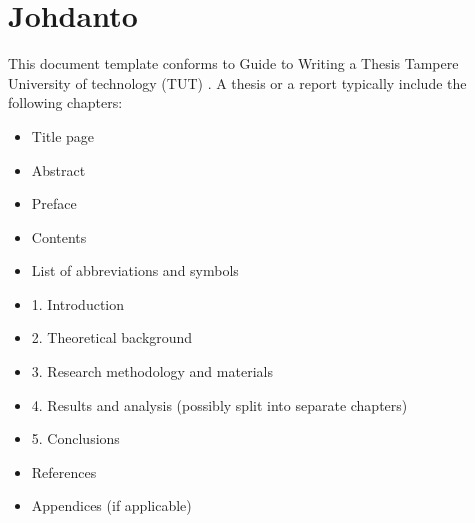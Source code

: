 \documentclass[12pt,a4paper,finnish]{tutthesis}
\begin{document}
\cleardoublepage

\newpage             %
\setcounter{page}{1} %
\renewcommand{\chaptername}{} %
\chapter{Johdanto}
\label{ch:johdanto} 




This document template conforms to Guide to Writing a Thesis Tampere
University of technology (TUT) \cite{thesisguide13}. A thesis or a
report typically include the following chapters:
\begin{itemize}
  \setlength{\itemsep}{-10pt} %
\item[] Title page           %
\item[] Abstract
\item[] Preface
\item[] Contents
\item[] List of abbreviations and symbols
\item[] 1. Introduction
\item[] 2. Theoretical background
\item[] 3. Research methodology and materials
\item[] 4. Results and analysis (possibly split into separate chapters)
\item[] 5. Conclusions
\item[] References
\item[] Appendices (if applicable)
\end{itemize}
\end{document}

